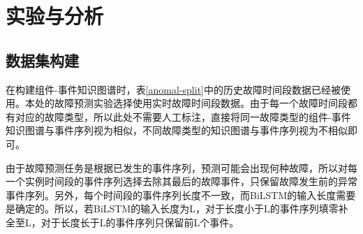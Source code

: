 \section{实验与分析}
\subsection{数据集构建}
在构建组件-事件知识图谱时，表\ref{anomal-split}中的历史故障时间段数据已经被使用。本处的故障预测实验选择使用实时故障时间段数据。由于每一个故障时间段都有对应的故障类型，所以此处不需要人工标注，直接将同一故障类型的组件-事件知识图谱与事件序列视为相似，不同故障类型的知识图谱与事件序列视为不相似即可。

由于故障预测任务是根据已发生的事件序列，预测可能会出现何种故障，所以对每一个实例时间段的事件序列选择去除其最后的故障事件，只保留故障发生前的异常事件序列。另外，每个时间段的事件序列长度不一致，而BiLSTM的输入长度需要是确定的。所以，若BiLSTM的输入长度为L，对于长度小于L的事件序列填零补全至L，对于长度长于L的事件序列只保留前L个事件。

